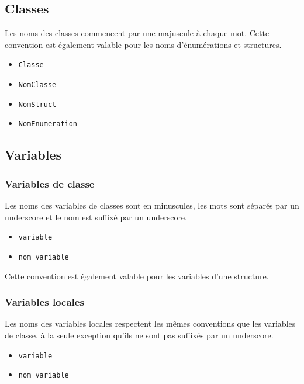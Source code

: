 \documentclass[]{report}
\begin{document}
\subsection{Classes}

Les noms des classes commencent par une majuscule à chaque mot.
Cette convention est également valable pour les noms 
d'énumérations et structures.

\begin{itemize}
	\item \texttt{Classe}
	\item \texttt{NomClasse}
	\item \texttt{NomStruct}
	\item \texttt{NomEnumeration}
\end{itemize}

\newpage

\subsection{Variables}

\subsubsection{Variables de classe}

Les noms des variables de classes sont en minuscules, les mots sont 
séparés par un underscore et le nom est suffixé par un underscore.

\begin{itemize}
	\item \texttt{variable\_}
	\item \texttt{nom\_variable\_}
\end{itemize}

Cette convention est également valable pour les variables d'une
structure.

\subsubsection{Variables locales}

Les noms des variables locales respectent les mêmes conventions 
que les variables de classe, à la seule exception qu’ils ne sont pas
suffixés par un underscore.

\begin{itemize}
	\item \texttt{variable}
	\item \texttt{nom\_variable}
\end{itemize}
\end{document}
